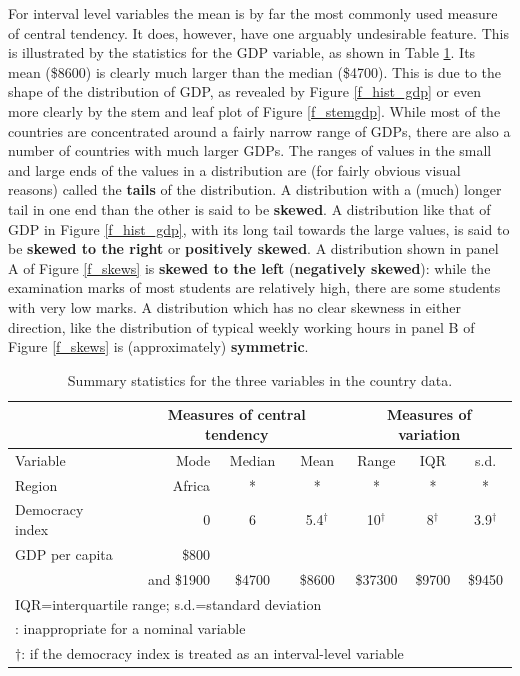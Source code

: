 For interval level variables the mean is by far the most commonly
used measure of central tendency. It does, however, have one arguably
undesirable feature. This is illustrated by the statistics for the GDP
variable, as shown in Table \ref{t_countries_sums}. Its mean
(\$8600) is clearly much larger than the median (\$4700).
This is due to the shape of the distribution of
GDP, as revealed by Figure \ref{f_hist_gdp} or even more clearly by the
stem and leaf plot of Figure \ref{f_stemgdp}. While
most of the countries are concentrated around a fairly narrow range of
GDPs, there are also a number of countries with much larger GDPs. The
ranges of values in the small and large ends of the values in a
distribution are (for fairly obvious visual reasons) called the
\textbf{tails} of the distribution. A distribution with a (much) longer
tail in one end than the other is said to be \textbf{skewed}. A
distribution like that of GDP in Figure \ref{f_hist_gdp}, with its long
tail towards the large values, is said to be \textbf{skewed to the
right} or \textbf{positively skewed}. A distribution shown in panel A
of Figure \ref{f_skews} is \textbf{skewed to the left}
(\textbf{negatively skewed}): while the examination marks of most
students are relatively high, there are some students with very low
marks. A distribution which has no clear skewness
in either direction, like the
distribution of typical weekly working hours
in panel B of Figure \ref{f_skews} is
(approximately) \textbf{symmetric}.


\begin{table}
\caption{Summary statistics for the three variables in the country data.}
\label{t_countries_sums}
\begin{center}
\begin{tabular}{|l|rcc|ccc|}\hline
& \multicolumn{3}{|c|}{Measures of central tendency} &
\multicolumn{3}{|c|}{Measures of variation} \\ \hline
Variable & Mode & Median & Mean & Range & IQR & s.d. \\ \hline
Region & Africa & * & * & * & * & * \\
Democracy index & 0 & 6 & 5.4$^{\dagger}$ & 10$^{\dagger}$& 8$^{\dagger}$
& 3.9$^{\dagger}$\\
GDP per capita & \$800 & & & & & \\
 & and \$1900 & \$4700 & \$8600 & \$37300 & \$9700& \$9450\\
\hline
\multicolumn{7}{l}{\footnotesize IQR=interquartile range; s.d.=standard
deviation} \\
\multicolumn{7}{l}{\footnotesize *: inappropriate for a nominal
variable}\\
\multicolumn{7}{l}{\footnotesize $\dagger$: if the democracy index is
treated as an interval-level variable}
\end{tabular}
\end{center}
\end{table}



